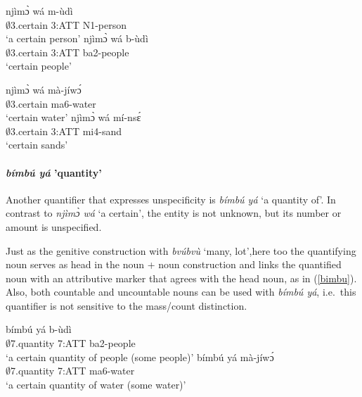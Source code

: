 \begin{exe}
\ex\label{ndjimo}
\begin{xlist}
\ex \label{ndjimo1}
  \gll    njìmɔ̀ wá m-ùdì  \\
                $\emptyset$3.certain 3:ATT N1-person \\
    \trans `a certain person'
\ex\label{ndjimo2}
 \gll    njìmɔ̀ wá  b-ùdì \\
             $\emptyset$3.certain 3:ATT ba2-people  \\
    \trans `certain people'
\end {xlist}
\end {exe}

\begin{exe}
\ex\label{ndjimob}
\begin{xlist}
\ex \label{ndjimob1}
  \gll    njìmɔ̀ wá mà-jíwɔ́ \\
                $\emptyset$3.certain ma6-water \\
    \trans `certain water'
\ex\label{ndjimob2}
 \gll    njìmɔ̀ wá  mí-nsɛ́ \\
             $\emptyset$3.certain 3:ATT mi4-sand  \\
    \trans `certain sands'
\end {xlist}
\end {exe}


\paragraph{{\itshape bímbú yá} 'quantity'} 
Another quantifier that expresses unspecificity is {\itshape bímbú yá} `a quantity of'. In contrast to {\itshape njìmɔ̀ wá} `a certain', the entity is not unknown, but its number or amount is unspecified.

 Just as the genitive construction with {\itshape bvúbvù} `many, lot',here too  the quantifying noun serves as head in the noun + noun construction and links the quantified noun with an attributive marker that agrees with the head noun, as in (\ref{bimbu}). Also, both countable and uncountable nouns can be used with {\itshape bímbú yá}, i.e.~this quantifier is not sensitive to the mass/count distinction. 

\begin{exe}
\ex\label{bimbu}
\begin{xlist}
\ex \label{bimbu1}
  \gll     bímbú yá b-ùdì \\
                $\emptyset$7.quantity 7:ATT ba2-people \\
    \trans `a certain quantity of people (some people)'
\ex\label{bimbu2}
 \gll    bímbú yá mà-jíwɔ́  \\
             $\emptyset$7.quantity 7:ATT ma6-water  \\
    \trans `a certain quantity of water (some water)'
\end {xlist}
\end {exe}

